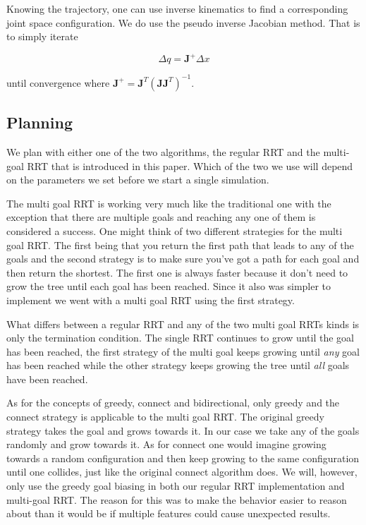 \documentclass[letterpaper, 10 pt, conference]{ieeeconf}  %
\begin{document}
Knowing the trajectory, one can use inverse kinematics to find a corresponding
joint space configuration. We do use the pseudo inverse Jacobian method.
That is to simply iterate

\[
  \Delta q = \mathbf{J}^{+} \Delta x
\]

until convergence where $\mathbf{J}^{+} =
\mathbf{J}^T(\mathbf{J}\mathbf{J}^T)^{-1}$.


\subsection{Planning}

We plan with either one of the two algorithms, the regular RRT
\cite{lavalle2001randomized} and the multi-goal RRT that is introduced in this
paper. Which of the two we use will depend on the parameters we set before we
start a single simulation.

The multi goal RRT is working very much like the traditional one with
the exception that there are multiple goals and reaching any one of them
is considered a success. One might think of two different strategies for
the multi goal RRT. The first being that you return the first path that
leads to any of the goals and the second strategy is to make sure you've
got a path for each goal and then return the shortest. The first one is
always faster because it don't need to grow the tree until each goal has
been reached. Since it also was simpler to implement we went with a
multi goal RRT using the first strategy.

What differs between a regular RRT and any of the two multi goal RRTs
kinds is only the termination condition. The single RRT continues to
grow until the goal has been reached, the first strategy of the multi
goal keeps growing until \emph{any} goal has been reached while the
other strategy keeps growing the tree until \emph{all} goals have been
reached.

As for the concepts of greedy, connect and bidirectional, only greedy and the
connect strategy is applicable to the multi goal RRT. The original greedy
strategy takes the goal and grows towards it\cite{robocup, FergusonKS06}. In
our case we take any of the goals randomly and grow towards it. As for connect
one would imagine growing towards a random configuration and then keep growing
to the same configuration until one collides, just like the original connect
algorithm does\cite{kuffner2000rrt}. We will, however, only use the greedy goal
biasing in both our regular RRT implementation and multi-goal RRT. The reason
for this was to make the behavior easier to reason about than it would be if
multiple features could cause unexpected results.
\end{document}
